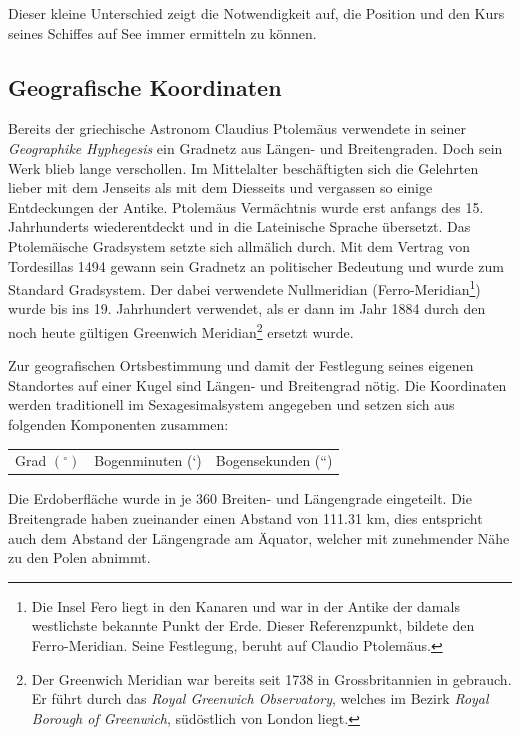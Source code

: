 \begin{refsection}
Dieser kleine Unterschied zeigt die Notwendigkeit auf, die Position und den Kurs seines Schiffes auf See immer ermitteln zu können.


\subsection{Geografische Koordinaten}
Bereits der griechische Astronom Claudius Ptolemäus verwendete in seiner \textit{Geographike Hyphegesis} ein Gradnetz aus Längen- und Breitengraden. Doch sein Werk  blieb lange verschollen. Im Mittelalter beschäftigten sich die Gelehrten lieber mit dem Jenseits als mit dem Diesseits und vergassen so einige Entdeckungen der Antike.
Ptolemäus Vermächtnis wurde erst anfangs des 15. Jahrhunderts wiederentdeckt und in die Lateinische Sprache übersetzt. Das Ptolemäische Gradsystem setzte sich allmälich durch.
Mit dem Vertrag von Tordesillas 1494 gewann sein Gradnetz an politischer Bedeutung und wurde zum Standard Gradsystem. Der dabei verwendete Nullmeridian (Ferro-Meridian\footnote{%
Die Insel Fero liegt in den Kanaren und war in der Antike der damals westlichste bekannte Punkt der Erde. Dieser Referenzpunkt, bildete den Ferro-Meridian. Seine Festlegung, beruht auf Claudio Ptolemäus.}) wurde bis ins 19. Jahrhundert verwendet, als er dann im Jahr 1884 durch den noch heute gültigen Greenwich Meridian\footnote{%
Der Greenwich Meridian war bereits seit 1738 in Grossbritannien in gebrauch. Er führt durch das \textit{Royal Greenwich Observatory}, welches im Bezirk \textit{Royal Borough of Greenwich}, südöstlich von London liegt.}
ersetzt wurde.

Zur geografischen Ortsbestimmung und damit der Festlegung seines eigenen Standortes auf einer Kugel sind Längen- und Breitengrad nötig. 
Die Koordinaten werden traditionell im Sexagesimalsystem angegeben und setzen sich aus folgenden Komponenten zusammen:

\begin{center}
\renewcommand{\arraystretch}{1.5}
\begin{tabular}{ccc}
Grad $(^{\circ})$ & Bogenminuten (`) & Bogensekunden (``)
\end{tabular}
\end{center}

Die Erdoberfläche wurde in je 360 Breiten- und Längengrade eingeteilt. Die Breitengrade haben zueinander einen Abstand von 111.31 km, dies entspricht auch dem Abstand der Längengrade am Äquator, welcher mit zunehmender Nähe zu den Polen abnimmt.


\end{refsection}
